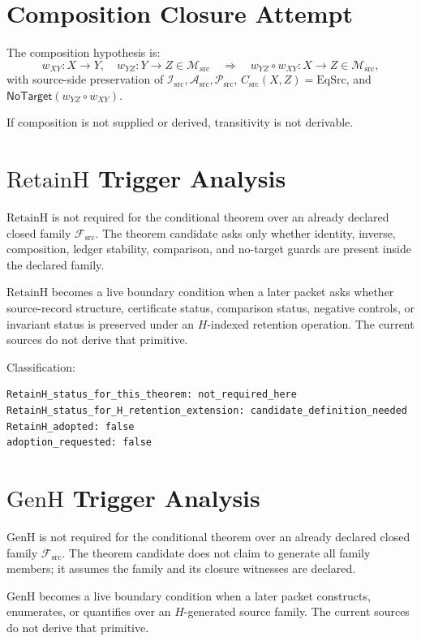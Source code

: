\documentclass[11pt]{article}
\newcommand{\EqSrc}{\mathrm{EqSrc}}
\newcommand{\RetainH}{\mathrm{RetainH}}
\newcommand{\GenH}{\mathrm{GenH}}
\newcommand{\Fsrc}{\mathcal{F}_{\mathrm{src}}}
\newcommand{\Msrc}{\mathcal{M}_{\mathrm{src}}}
\newcommand{\Isrc}{\mathcal{I}_{\mathrm{src}}}
\newcommand{\Asrc}{\mathcal{A}_{\mathrm{src}}}
\newcommand{\Psrc}{\mathcal{P}_{\mathrm{src}}}
\newcommand{\Csrc}{C_{\mathrm{src}}}
\newcommand{\NoTarget}{\mathsf{NoTarget}}
\begin{document}
\section{Composition Closure Attempt}

The composition hypothesis is:
\[
  w_{XY}:X\to Y,\quad w_{YZ}:Y\to Z\in\Msrc
  \quad\Longrightarrow\quad
  w_{YZ}\circ w_{XY}:X\to Z\in\Msrc,
\]
with source-side preservation of \(\Isrc,\Asrc,\Psrc\), \(\Csrc(X,Z)=\EqSrc\),
and \(\NoTarget(w_{YZ}\circ w_{XY})\).

If composition is not supplied or derived, transitivity is not derivable.

\section{\(\RetainH\) Trigger Analysis}

\(\RetainH\) is not required for the conditional theorem over an already
declared closed family \(\Fsrc\). The theorem candidate asks only whether
identity, inverse, composition, ledger stability, comparison, and no-target
guards are present inside the declared family.

\(\RetainH\) becomes a live boundary condition when a later packet asks
whether source-record structure, certificate status, comparison status,
negative controls, or invariant status is preserved under an \(H\)-indexed
retention operation. The current sources do not derive that primitive.

Classification:

\begin{verbatim}
RetainH_status_for_this_theorem: not_required_here
RetainH_status_for_H_retention_extension: candidate_definition_needed
RetainH_adopted: false
adoption_requested: false
\end{verbatim}

\section{\(\GenH\) Trigger Analysis}

\(\GenH\) is not required for the conditional theorem over an already declared
closed family \(\Fsrc\). The theorem candidate does not claim to generate all
family members; it assumes the family and its closure witnesses are declared.

\(\GenH\) becomes a live boundary condition when a later packet constructs,
enumerates, or quantifies over an \(H\)-generated source family. The current
sources do not derive that primitive.
\end{document}
